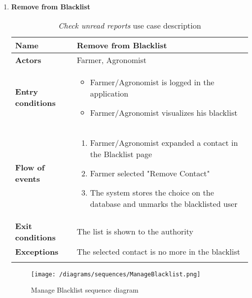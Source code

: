 \begin{enumerate}
			\item \textbf{Remove from Blacklist}
				\begin{longtable}{p{0.26\linewidth}p{0.75\linewidth}}
					\toprule
					\textbf{Name} & \textbf{Remove from Blacklist} \\
					\midrule
					\textbf{Actors} & Farmer, Agronomist \\
					\midrule
					\textbf{Entry conditions} & \begin{itemize}
													\item Farmer/Agronomist is logged in the application
													\item Farmer/Agronomist visualizes his blacklist
												\end{itemize} \\
					\midrule
					\textbf{Flow of events} & 
					\begin{enumerate}
						\item Farmer/Agronomist expanded a contact in the Blacklist page
						\item Farmer selected "Remove Contact"
						\item The system stores the choice on the database and unmarks the blacklisted user
					\end{enumerate} \\
					\midrule
					\textbf{Exit conditions} & The list is shown to the authority\\
					\midrule
					\textbf{Exceptions} &  The selected contact is no more in the blacklist\\
					\bottomrule
					\caption{\emph{Check unread reports} use case description}
				\end{longtable}
				
				\begin{figure}[h]
					\centering
					\texttt{[image: /diagrams/sequences/ManageBlacklist.png]}
					\caption{Manage Blacklist sequence diagram}
				\end{figure}
				

\end{enumerate}

